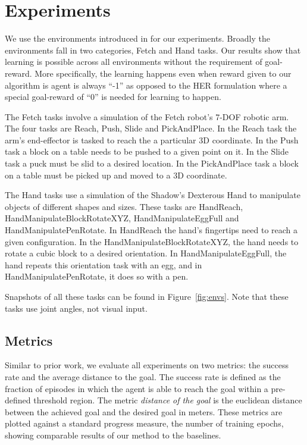 \section{Experiments}
\label{sec:experiments}

We use the environments introduced in \citet{plappert2018multi} for our experiments.
Broadly the environments fall in two categories, Fetch and Hand tasks.
Our results show that learning is possible across all environments
without the requirement of goal-reward. More specifically, the learning happens
even when reward given to our algorithm is agent is always ``-1'' as opposed to
the HER formulation where a special goal-reward of ``0'' is needed for learning
to happen.

The Fetch tasks involve a simulation of the Fetch robot's 7-DOF robotic arm. The four tasks are Reach, Push,
Slide and PickAndPlace.
In the Reach task the arm's end-effector is tasked to reach the a particular 3D coordinate. 
In the Push task a block on a table needs to be pushed to a given point on it.
In the Slide task a puck must be slid to a desired location.
In the PickAndPlace task a block on a table must be picked up and moved to a
3D coordinate.

The Hand tasks use a simulation of the Shadow's Dexterous Hand to manipulate objects of
different shapes and sizes. These tasks are HandReach,
HandManipulateBlockRotateXYZ, HandManipulateEggFull and HandManipulatePenRotate.
In HandReach the hand's fingertips need to reach a given configuration.
In the HandManipulateBlockRotateXYZ, the hand needs to rotate a cubic
block to a desired orientation.
In HandManipulateEggFull, the hand repeats this orientation task with an egg, and in
HandManipulatePenRotate, it does so with a pen.

Snapshots of all these tasks can be found in Figure~\ref{fig:envs}. Note that
these tasks use joint angles, not visual input.



\subsection{Metrics}
Similar to prior work, we evaluate all experiments on two metrics: the success
rate and the average distance to the goal. The success rate is defined as the
fraction of episodes in which the agent is able to reach the goal within a
pre-defined threshold region.
The metric \emph{distance of the goal} is the euclidean distance between
the achieved goal and the desired goal in meters.
These metrics are plotted against a standard progress measure, the
number of training epochs, showing
comparable results of our method to the baselines.


